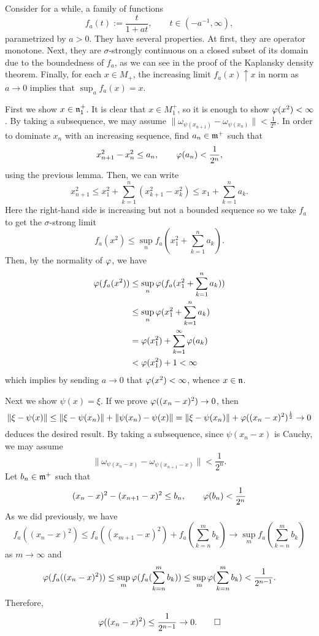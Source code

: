 \documentclass{../../../small}
\begin{document}
\begin{pf}
Consider for a while, a family of functions
\[f_a(t):=\frac t{1+at},\qquad t\in(-a^{-1},\infty),\]
parametrized by $a>0$.
They have several properties.
At first, they are operator monotone.
Next, they are $\sigma$-strongly continuous on a closed subset of its domain due to the boundedness of $f_a$, as we can see in the proof of the Kaplansky density theorem.
Finally, for each $x\in M_+$, the increasing limit $f_a(x)\uparrow x$ in norm as $a\to0$ implies that $\sup_af_a(x)=x$.

First we show $x\in\mathfrak{n}^+_1$.
It is clear that $x\in M^+_1$, so it is enough to show $\varphi(x^2)<\infty$.
By taking a subsequence, we may assume $\|\omega_{\psi(x_{n+1})}-\omega_{\psi(x_n)}\|<\frac1{2^n}$.
In order to dominate $x_n$ with an increasing sequence, find $a_n\in\mathfrak{m}^+$ such that
\[x_{n+1}^2-x_n^2\le a_n,\qquad \varphi(a_n)<\frac1{2^n},\]
using the previous lemma.
Then, we can write
\[x_{n+1}^2\le x_1^2+\sum_{k=1}^n(x_{k+1}^2-x_k^2)\le x_1+\sum_{k=1}^na_k.\]
Here the right-hand side is increasing but not a bounded sequence so we take $f_a$ to get the $\sigma$-strong limit
\[f_a(x^2)\le\sup_nf_a(x_1^2+\sum_{k=1}^na_k).\]
Then, by the normality of $\varphi$, we have
\begin{align*}
\varphi(f_a(x^2))
&\le\sup_n\varphi(f_a(x_1^2+\sum_{k=1}^na_k))\\
&\le\sup_n\varphi(x_1^2+\sum_{k=1}^na_k)\\
&=\varphi(x_1^2)+\sum_{k=1}^\infty\varphi(a_k)\\
&<\varphi(x_1^2)+1<\infty
\end{align*}
which implies by sending $a\to0$ that $\varphi(x^2)<\infty$, whence $x\in\mathfrak{n}$.

Next we show $\psi(x)=\xi$.
If we prove $\varphi((x_n-x)^2)\to0$, then
\[\|\xi-\psi(x)\|\le\|\xi-\psi(x_n)\|+\|\psi(x_n)-\psi(x)\|=\|\xi-\psi(x_n)\|+\varphi((x_n-x)^2)^{\frac12}\to0\]
deduces the desired result.
By taking a subsequence, since $\psi(x_n-x)$ is Cauchy, we may assume
\[\|\omega_{\psi(x_n-x)}-\omega_{\psi(x_{n+1}-x)}\|<\frac1{2^n}.\]
Let $b_n\in\mathfrak{m}^+$ such that
\[(x_n-x)^2-(x_{n+1}-x)^2\le b_n,\qquad\varphi(b_n)<\frac1{2^n}\]
As we did previously, we have
\[f_a((x_n-x)^2)\le f_a((x_{m+1}-x)^2)+f_a(\sum_{k=n}^mb_k)\to\sup_mf_a(\sum_{k=n}^mb_k)\]
as $m\to\infty$ and
\[\varphi(f_a((x_n-x)^2))
\le\sup_m\varphi(f_a(\sum_{k=n}^mb_k))
\le\sup_m\varphi(\sum_{k=n}^mb_k)<\frac1{2^{n-1}}.\]
Therefore,
\[\varphi((x_n-x)^2)\le\frac1{2^{n-1}}\to0.\qedhere\]
\end{pf}
\end{document}
